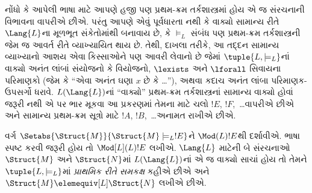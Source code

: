 નોંધો કે આપેલી ભાષા માટે આપણે હજી પણ પ્રથમ-ક્રમ તર્કશાસ્ત્રમાં
હોય એ જ સંરચનાની વિભાવના વાપરીએ છીએ. પરંતુ આપણે એવું પૂર્વધારતા
નથી કે વાક્યો સામાન્ય રીતે $\Lang{L}$ના મૂળભૂત સંકેતોમાંથી
બનાવાય છે, કે $\models_L$ સંબંધ પણ પ્રથમ-ક્રમ તર્કશાસ્ત્રની જેમ જ
આવર્ત રીતે વ્યાખ્યાયિત થાય છે. તેથી, દાખલા તરીકે, આ તદ્દન સામાન્ય
વ્યાખ્યાનો આશય એવા કિસ્સાઓને પણ આવરી લેવાનો છે જેમાં
$\tuple{L,\models_L}$નાં વાક્યો અનંત લાંબાં સંયોજનો કે વિયોજનો,
$\lexists$ અને $\lforall$ સિવાયના પરિમાણકો (જેમ કે ``એવા અનંત ઘણા
$x$ છે કે \dots''), અથવા કદાચ અનંત લાંબા પરિમાણક-ઉપસર્ગો ધરાવે.
$L(\Lang{L})$નાં ``વાક્યો'' પ્રથમ-ક્રમ તર્કશાસ્ત્રનાં સામાન્ય
વાક્યો હોવાં જરૂરી નથી એ પર ભાર મૂકવા આ પ્રકરણમાં તેમના માટે
ચલો $!E$, $!F$,~\dots વાપરીએ છીએ અને સામાન્ય પ્રથમ-ક્રમ
સૂત્રો માટે $!A$, $!B$,~\dots અનામત રાખીએ છીએ.

\begin{defn}
  વર્ગ $\Setabs{\Struct{M}}{\Struct{M} \models_L !E}$ને
  $\Mod(L){!E}$થી દર્શાવીએ. ભાષા સ્પષ્ટ કરવી જરૂરી હોય તો
  $\Mod[L](L){!E}$ લખીએ. $\Lang{L}$ માટેની બે સંરચનાઓ
  $\Struct{M}$ અને $\Struct{N}$માં $L(\Lang{L})$નાં એ જ
  વાક્યો સાચાં હોય તો તેમને $\tuple{L, \models_L}$માં
  \emph{પ્રાથમિક રીતે સમકક્ષ} કહીએ છીએ અને $\Struct{M}
  \elemequiv[L] \Struct{N}$ લખીએ છીએ.
\end{defn}

